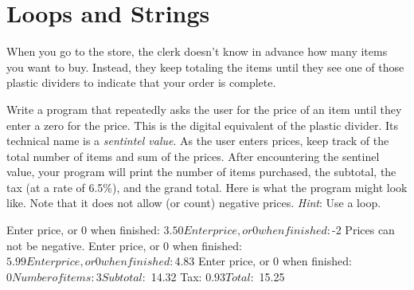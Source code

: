 \chapter{Loops and Strings}

\begin{exercise}
When you go to the store, the clerk doesn't know in advance how many items you want to buy. Instead, they keep totaling the items until they see one of those plastic dividers to indicate that your order is complete.

Write a program that repeatedly asks the user for the price of an item until they enter a zero for the price. This is the digital equivalent of the plastic divider. Its technical name is a {\em sentintel value}. As the user enters prices, keep track of the total number of items and sum of the prices.  After encountering the sentinel value, your program will print the number of items purchased, the subtotal, the tax (at a rate of 6.5\%), and the grand total. Here is what the program might look like. Note that it does not allow (or count) negative prices. {\em Hint}: Use a  loop.

\begin{stdout}
Enter price, or 0 when finished: $3.50    
Enter price, or 0 when finished: $-2
Prices can not be negative.
Enter price, or 0 when finished: $5.99
Enter price, or 0 when finished: $4.83
Enter price, or 0 when finished: $0

Number of items: 3
Subtotal:  $   14.32
Tax:       $    0.93
Total:     $   15.25
\end{stdout}
\end{exercise}


